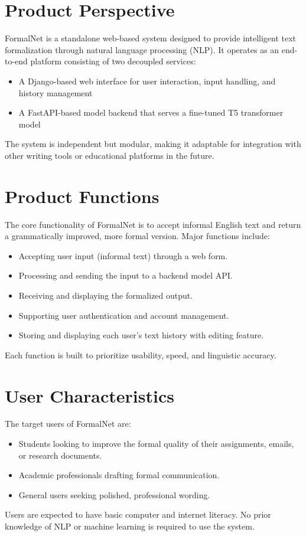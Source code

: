 \section{Product Perspective}

FormalNet is a standalone web-based system designed to provide intelligent text formalization through natural language processing (NLP). It operates as an end-to-end platform consisting of two decoupled services:
\begin{itemize}
    \item A Django-based web interface for user interaction, input handling, and history management
    \item A FastAPI-based model backend that serves a fine-tuned T5 transformer model
\end{itemize}

The system is independent but modular, making it adaptable for integration with other writing tools or educational platforms in the future.\


\section{Product Functions}

The core functionality of FormalNet is to accept informal English text and return a grammatically improved, more formal version. Major functions include:

\begin{itemize}
    \item Accepting user input (informal text) through a web form.
    \item Processing and sending the input to a backend model API.
    \item Receiving and displaying the formalized output.
    \item Supporting user authentication and account management.
    \item Storing and displaying each user's text history with editing feature.
\end{itemize}
Each function is built to prioritize usability, speed, and linguistic accuracy.


\section{User Characteristics}
The target users of FormalNet are:
\begin{itemize}
    \item Students looking to improve the formal quality of their assignments, emails, or research documents.
    \item Academic professionals drafting formal communication.
    \item General users seeking polished, professional wording.
\end{itemize}
Users are expected to have basic computer and internet literacy. No prior knowledge of NLP or machine learning is required to use the system.


